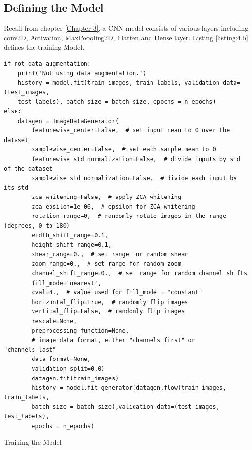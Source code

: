 \subsection{Defining the Model}
Recall from chapter \ref{Chapter 3}, a CNN model consists of various layers including
conv2D, Activation, MaxPoooling2D, Flatten and Dense layer. Listing \ref{listing:4.5}
defines the training Model.

\begin{listing}[H]
    \begin{verbatim}
if not data_augmentation:
    print('Not using data augmentation.')
    history = model.fit(train_images, train_labels, validation_data=(test_images,
    test_labels), batch_size = batch_size, epochs = n_epochs)
else:
    datagen = ImageDataGenerator(
        featurewise_center=False,  # set input mean to 0 over the dataset
        samplewise_center=False,  # set each sample mean to 0
        featurewise_std_normalization=False,  # divide inputs by std of the dataset
        samplewise_std_normalization=False,  # divide each input by its std
        zca_whitening=False,  # apply ZCA whitening
        zca_epsilon=1e-06,  # epsilon for ZCA whitening
        rotation_range=0,  # randomly rotate images in the range (degrees, 0 to 180)
        width_shift_range=0.1,
        height_shift_range=0.1,
        shear_range=0.,  # set range for random shear
        zoom_range=0.,  # set range for random zoom
        channel_shift_range=0.,  # set range for random channel shifts
        fill_mode='nearest',
        cval=0.,  # value used for fill_mode = "constant"
        horizontal_flip=True,  # randomly flip images
        vertical_flip=False,  # randomly flip images
        rescale=None,
        preprocessing_function=None,
        # image data format, either "channels_first" or "channels_last"
        data_format=None,
        validation_split=0.0)
        datagen.fit(train_images)
        history = model.fit_generator(datagen.flow(train_images, train_labels,
        batch_size = batch_size),validation_data=(test_images, test_labels),
        epochs = n_epochs)  
    \end{verbatim}
    \caption{Training the Model}
\label{listing:4.6}
\end{listing}
